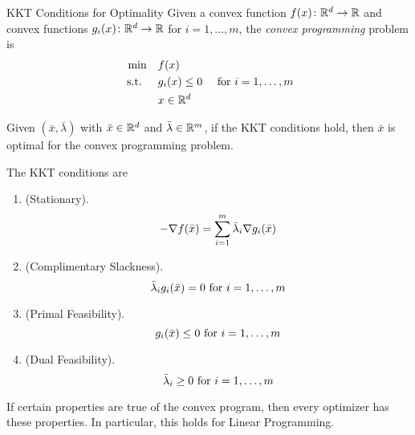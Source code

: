 \documentclass[../open-optimization/open-optimization.tex]{subfiles}
\begin{document}
\begin{general}{KKT Conditions for Optimality}{}
Given a convex function $f(x)\colon {\mathbb{R}}^d \to {\mathbb{R}}$ and convex functions $g_i(x)\colon {\mathbb{R}}^d \to {\mathbb{R}}$ for $i=1, \dots, m$,  the \emph{convex programming} problem is
\begin{equation}
\label{eq:convex-programming-KKT}
\begin{split}
\min \quad & f(x)\\
\text{ s.t. }  \quad & g_i(x) \leq 0  \quad  \text{ for } i=1, \dots, m\\
& x \in {\mathbb{R}}^d
\end{split}
\end{equation}

Given $(\bar x, \bar \lambda)$ with $\bar x \in {\mathbb{R}}^d$ and $\bar \lambda \in {\mathbb{R}}^m$, if the KKT conditions hold, then $\bar x$ is optimal for the convex programming problem.  

The KKT conditions are
\begin{enumerate}
\item (Stationary).   
\begin{equation}
- \nabla f(\bar x) = \sum_{i=1}^m \bar \lambda_i \nabla g_i(\bar x)\\
\end{equation}
\item (Complimentary Slackness).   
\begin{equation}
 \bar \lambda_i  g_i(\bar x) = 0 \text{ for } i=1, \dots, m\\
\end{equation}
\item (Primal Feasibility).   
\begin{equation}
  g_i(\bar x) \leq 0 \text{ for } i=1, \dots, m\\
\end{equation}
\item (Dual Feasibility).   
\begin{equation}
 \bar \lambda_i \geq 0 \text{ for } i=1, \dots, m\\
\end{equation}
\end{enumerate}
\end{general}

If certain properties are true of the convex program, then every optimizer has these properties.   In particular, this holds for Linear Programming.



\begin{minipage}{0.5\textwidth}
\end{minipage}
\begin{minipage}{0.5\textwidth}
\end{minipage}
\end{document}
